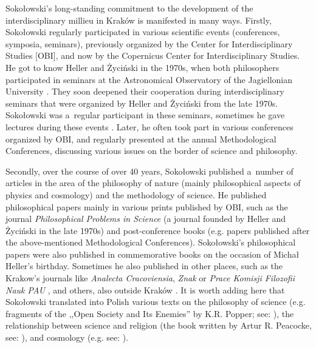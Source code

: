 \documentclass[%
  manuscript=article,
  year=2024,
  volume=77,
  doi=10.59203/zfn.77.689,
]{zfn}
\begin{document}
Sokołowski's long-standing commitment to the development of the interdisciplinary millieu in Kraków is manifested in many ways. Firstly, Sokołowski regularly participated in various scientific events (conferences, symposia, seminars), previously organized by the Center for Interdisciplinary Studies [OBI], and now by the Copernicus Center for Interdisciplinary Studies. He got to know Heller and Życiński in the 1970s, when both philosophers participated in seminars at the Astronomical Observatory of the Jagiellonian University 
\parencite[][]{Sokoowski2015Racjonalny}. %
 They soon deepened their cooperation during interdisciplinary seminars that were organized by Heller and Życiński from the late 1970s. Sokołowski was a~regular participant in these seminars, sometimes he gave lectures during these events 
\parencite[][]{Liana1999Z}. %
 Later, he often took part in various conferences organized by OBI, and regularly presented at the annual Methodological Conferences, discussing various issues on the border of science and philosophy.



Secondly, over the course of over 40 years, Sokołowski published a~number of articles in the area of the philosophy of nature (mainly philosophical aspects of physics and cosmology) and the methodology of science. He published philosophical papers mainly in various prints published by OBI, such as the journal \textit{Philosophical Problems in Science} (a journal founded by Heller and Życiński in the late 1970s) and post-conference books (e.g. papers published after the above-mentioned Methodological Conferences). Sokołowski's philosophical papers were also published in commemorative books on the occasion of Michał Heller's birthday. Sometimes he also published in other places, such as the Krakow's journals like \textit{Analecta Cracoviensia}, \textit{Znak} or \textit{Prace Komisji Filozofii Nauk PAU} 
\parencite[e.g.,][]{Sokoowski2008Uzasadnianie}, %
 and others, also outside Kraków 
\parencites[see e.g.,][]{Sokoowski1978Czy}[][]{Sokoowski1984O}[][]{Sokoowski1986Pluralizm}. %
 It is worth adding here that Sokołowski translated into Polish various texts on the philosophy of science (e.g. fragments of the ,,Open Society and Its Enemies'' by K.R. Popper; see: 
\parencite[][]{Popper1987Hegel}%
), the relationship between science and religion (the book written by Artur R. Peacocke, see: 
\parencite[][]{Peacocke1991Teologia}%
), and cosmology (e.g. see: 
\parencite[][]{Davies1996Zasada}%
).
\end{document}
